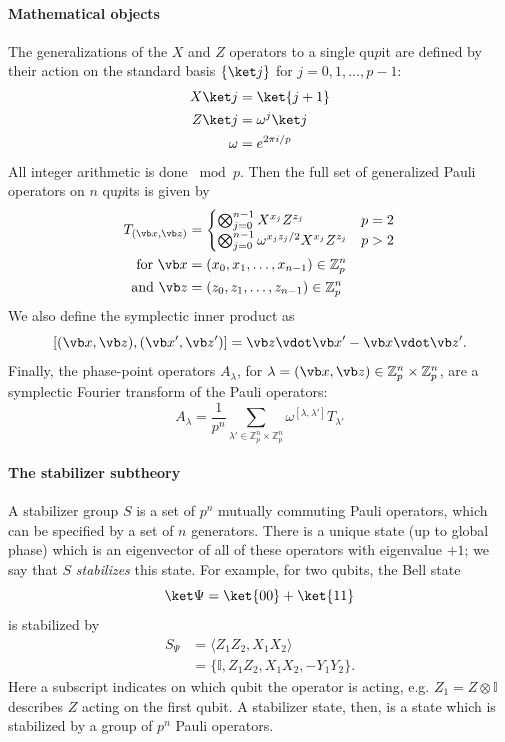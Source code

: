 \documentclass[%
 reprint,
superscriptaddress,
nofootinbib,
 amsmath,amssymb,
 prx, 
 accepted=2019-09-27,
]{quantumarticle}
\newcommand{\Z}{\mathbb{Z}}
\newcommand{\Id}{\mathbb{I}}
\begin{document}
\paragraph{Mathematical objects} The generalizations of the $X$ and
$Z$ operators to a single qu$p$it are defined by their action on the
standard basis $\{\ket j\}$ for $j=0,1,\ldots,p-1$:
\begin{align}
  X\ket j &= \ket{j+1}\\
  Z\ket j &= \omega^j\ket j\\
  \omega &= e^{2\pi i/p}
\end{align}
All integer arithmetic is done $\bmod p$. Then the full set of
generalized Pauli operators on $n$ qu$p$its is given by
\begin{align}
  T_{(\vb x,\vb z)}
  &=
    \begin{cases}
      \bigotimes_{j=0}^{n-1} X^{x_j}Z^{z_j} & p = 2\\
      \bigotimes_{j=0}^{n-1} \omega^{x_j z_j/2}X^{x_j}Z^{z_j} & p > 2
    \end{cases}\\
  \text{for } \vb x &= (x_0,x_1,\ldots,x_{n-1})\in\Z_p^n \nonumber\\
  \text{and } \vb z &= (z_0,z_1,\ldots,z_{n-1})\in\Z_p^n\nonumber
\end{align}
We also define the symplectic inner product as
\begin{equation}
  \label{eq:26}
  \left[ (\vb x, \vb z), (\vb x',\vb z')\right]
  = \vb z\vdot \vb x' - \vb x\vdot \vb z'.
\end{equation}
Finally, the phase-point operators $A_\lambda$, for
$\lambda=(\vb x,\vb z)\in \Z_p^n\times\Z_p^n$, are a symplectic
Fourier transform of the Pauli operators:
\begin{equation}
  \label{eq:27}
  A_\lambda = \frac{1}{p^n}\sum_{\lambda'\in\Z_p^n\times\Z_p^n}\omega^{[\lambda,\lambda']}T_{\lambda'}
\end{equation}


\paragraph{The stabilizer subtheory} A stabilizer group $S$ is a set
of $p^n$ mutually commuting Pauli operators, which can be specified by
a set of $n$ generators. There is a unique state (up to global phase)
which is an eigenvector of all of these operators with eigenvalue
$+1$; we say that $S$ \emph{stabilizes} this state. For example, for
two qubits, the Bell state
\begin{equation}
  \label{eq:24}
    \ket\Psi = \ket{00}+\ket{11}
\end{equation}
is stabilized by
\begin{align}
  \label{eq:25}
  S_\Psi &= \langle Z_1Z_2,X_1X_2 \rangle\\
         &=\{\Id,Z_1Z_2,X_1X_2,-Y_1Y_2\}.
\end{align}
Here a subscript indicates on which qubit the operator is acting,
e.g. $Z_1=Z\otimes\Id$ describes $Z$ acting on the first qubit. A
stabilizer state, then, is a state which is stabilized by a group of
$p^n$ Pauli operators.
 
\end{document}

